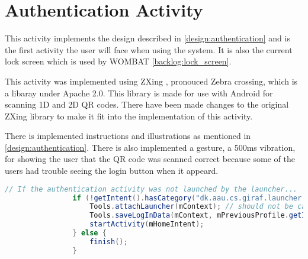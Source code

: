 \section{Authentication Activity}

This activity implements the design described in \autoref{design:authentication} and is the first activity the user will face when using the \giraf[] system. It is also the current lock screen which is used by WOMBAT \autoref{backlog:lock_screen}.

This activity was implemented using ZXing \citep{web:ZXing}, pronouced Zebra crossing, which is a libaray under Apache 2.0. This library is made for use with Android for scanning 1D and 2D QR codes. There have been made changes to the original ZXing library to make it fit into the implementation of this activity.

There is implemented instructions and illustrations as mentioned in \autoref{design:authentication}. There is also implemented a gesture, a 500ms vibration, for showing the user that the QR code was scanned correct because some of the users had trouble seeing the login button when it appeard.

\begin{lstlisting}[style=sourceCode, language=JAVA, caption=This is code, label=lst:authenticationAcitivity] 
				// If the authentication activity was not launched by the launcher...
				if (!getIntent().hasCategory("dk.aau.cs.giraf.launcher.GIRAF")) {
					Tools.attachLauncher(mContext); // should not be called
					Tools.saveLogInData(mContext, mPreviousProfile.getId());
					startActivity(mHomeIntent);
				} else {
					finish();
				}
\end{lstlisting}
